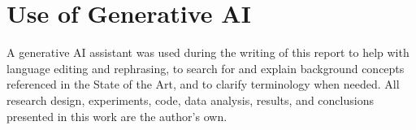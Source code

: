 \documentclass[10pt,twocolumn]{article}
\begin{document}
\section*{Use of Generative AI}

A generative AI assistant was used during the writing of this report to help with
language editing and rephrasing, to search for and explain background concepts
referenced in the State of the Art, and to clarify terminology when needed. All research
design, experiments, code, data analysis, results, and conclusions presented in this work
are the author's own.


\end{document}
